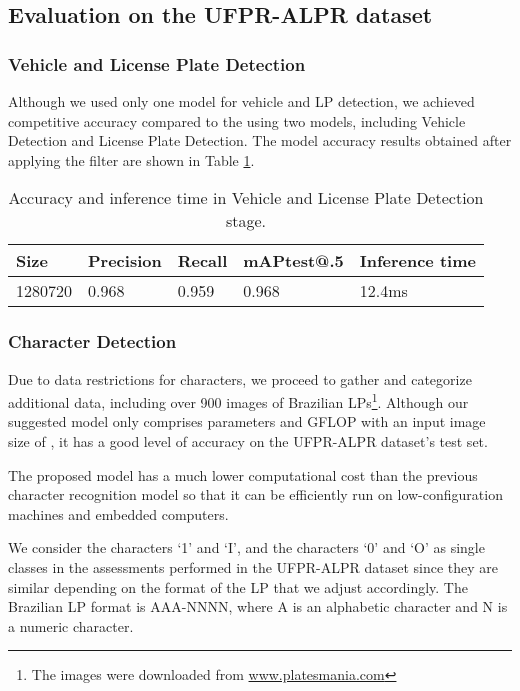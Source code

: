 \documentclass[conference]{IEEEtran}
\begin{document}
\subsection{Evaluation on the UFPR-ALPR dataset}


\subsubsection{Vehicle and License Plate Detection}
Although we used only one model for vehicle and LP detection, we achieved competitive accuracy compared to the \cite{layout} using two models, including Vehicle Detection and License Plate Detection. The model accuracy results obtained after applying the filter are shown in Table \ref{table2}.
\begin{table}[h!]
  \begin{center}
    \centering
    \caption{Accuracy and inference time in Vehicle and License Plate Detection stage.}
    \label{tab:table2}
    
\begin{tabular}{|p{11mm} | p{11mm} | p{8mm} | p{12mm} | p{11mm}|}
    \hline
      \textbf{Size} & \textbf{Precision} & \textbf{Recall}& \textbf{mAP\newline test@.5}&  \textbf{Inference time}\\
      \hline
      1280720 & 0.968  & 0.959 & 0.968 & 12.4ms\\
      \hline
    \end{tabular}
    \label{table2}
  \end{center}
\end{table}


\subsubsection{Character Detection}
Due to data restrictions for characters, we proceed to gather and categorize additional data, including over 900 images of Brazilian LPs\footnote{The images were downloaded from \url{www.platesmania.com}}. Although our suggested model only comprises  parameters and  GFLOP with an input image size of , it has a good level of accuracy on the UFPR-ALPR dataset's test set.

The proposed model has a much lower computational cost than the previous character recognition model \cite{layout} \cite{ufpr} so that it can be efficiently run on low-configuration machines and embedded computers.

We consider the characters `1' and `I', and the characters `0' and `O' as single classes in the assessments performed in the UFPR-ALPR dataset since they are similar depending on the format of the LP that we adjust accordingly. The Brazilian LP format is AAA-NNNN, where A is an alphabetic character and N is a numeric character.
\end{document}
